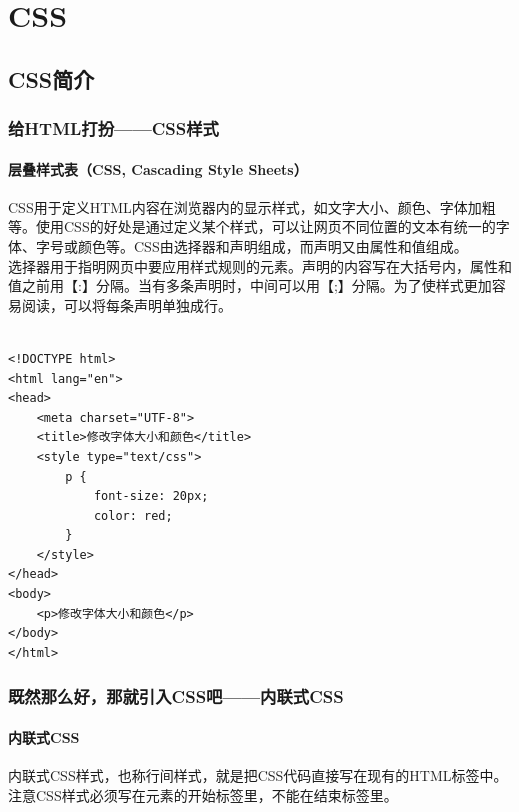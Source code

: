 \part{CSS}

\newpage

\chapter{CSS简介}

\section{给HTML打扮——CSS样式}

\subsection{层叠样式表（CSS, Cascading Style Sheets）}

CSS用于定义HTML内容在浏览器内的显示样式，如文字大小、颜色、字体加粗等。使用CSS的好处是通过定义某个样式，可以让网页不同位置的文本有统一的字体、字号或颜色等。CSS由选择器和声明组成，而声明又由属性和值组成。 \\

选择器用于指明网页中要应用样式规则的元素。声明的内容写在大括号内，属性和值之前用【:】分隔。当有多条声明时，中间可以用【;】分隔。为了使样式更加容易阅读，可以将每条声明单独成行。 \\

 \\
\begin{lstlisting}[style=htmlcssjs]
<!DOCTYPE html>
<html lang="en">
<head>
    <meta charset="UTF-8">
    <title>修改字体大小和颜色</title>
    <style type="text/css">
        p {
            font-size: 20px;
            color: red;
        }
    </style>
</head>
<body>
    <p>修改字体大小和颜色</p>
</body>
</html>
\end{lstlisting}

\newpage

\section{既然那么好，那就引入CSS吧——内联式CSS}

\subsection{内联式CSS}

内联式CSS样式，也称行间样式，就是把CSS代码直接写在现有的HTML标签中。注意CSS样式必须写在元素的开始标签里，不能在结束标签里。 \\


